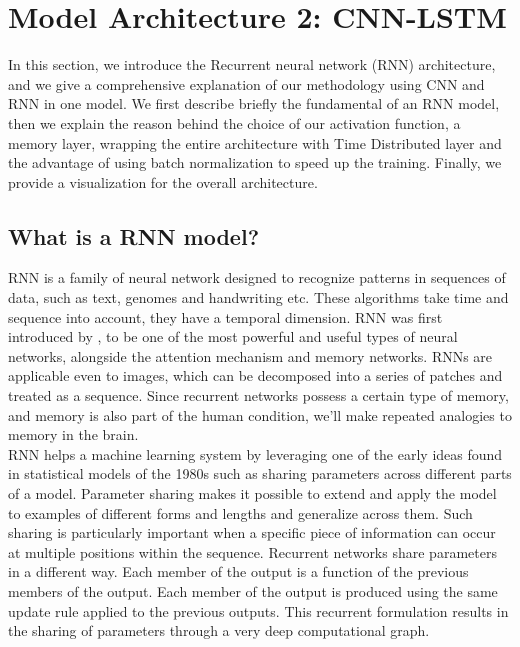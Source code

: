 

\section{Model Architecture 2: CNN-LSTM}
In this section, we introduce the Recurrent neural network (RNN) architecture, and we give a comprehensive explanation of our methodology using CNN and RNN in one model. We first describe briefly the fundamental of an RNN model, then we explain the reason behind the choice of our activation function, a memory layer, wrapping the entire architecture with Time Distributed layer and the advantage of using batch normalization to speed up the training. Finally, we provide a visualization for the overall architecture.

\subsection{What is a RNN model?}

RNN is a family of neural network designed to recognize patterns in sequences of data, such as text, genomes and handwriting etc. These algorithms take time and sequence into account, they have a temporal dimension.
RNN was first introduced by \cite{rumelhart1986learning}, to be one of the most powerful and useful types of neural networks, alongside the attention mechanism and memory networks. RNNs are applicable even to images, which can be decomposed into a series of patches and treated as a sequence.
Since recurrent networks possess a certain type of memory, and memory is also part of the human condition, we’ll make repeated analogies to memory in the brain.\\

RNN helps a machine learning system by leveraging one of the early ideas found in statistical models of the 1980s such as sharing parameters across different parts of a model. Parameter sharing makes it possible to extend and apply the model to examples of different forms and lengths and generalize across them. Such sharing is particularly important when a specific piece of information can occur at multiple positions within the sequence. Recurrent networks share parameters in a different way. Each member of the output is a function of the previous members of the output. Each member of the output is produced using the same update rule applied to the previous outputs. This recurrent formulation results in the sharing of parameters through a very deep computational graph.\\

